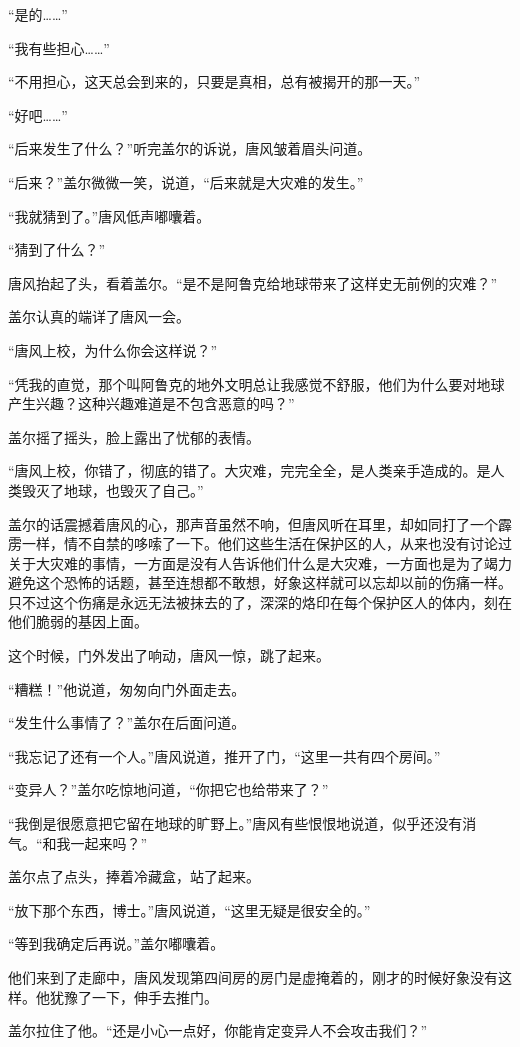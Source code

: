 “是的……”

“我有些担心……”

“不用担心，这天总会到来的，只要是真相，总有被揭开的那一天。”

“好吧……”

“后来发生了什么？”听完盖尔的诉说，唐风皱着眉头问道。

“后来？”盖尔微微一笑，说道，“后来就是大灾难的发生。”

“我就猜到了。”唐风低声嘟囔着。

“猜到了什么？”

唐风抬起了头，看着盖尔。“是不是阿鲁克给地球带来了这样史无前例的灾难？”

盖尔认真的端详了唐风一会。

“唐风上校，为什么你会这样说？”

“凭我的直觉，那个叫阿鲁克的地外文明总让我感觉不舒服，他们为什么要对地球产生兴趣？这种兴趣难道是不包含恶意的吗？”

盖尔摇了摇头，脸上露出了忧郁的表情。

“唐风上校，你错了，彻底的错了。大灾难，完完全全，是人类亲手造成的。是人类毁灭了地球，也毁灭了自己。”

盖尔的话震撼着唐风的心，那声音虽然不响，但唐风听在耳里，却如同打了一个霹雳一样，情不自禁的哆嗦了一下。他们这些生活在保护区的人，从来也没有讨论过关于大灾难的事情，一方面是没有人告诉他们什么是大灾难，一方面也是为了竭力避免这个恐怖的话题，甚至连想都不敢想，好象这样就可以忘却以前的伤痛一样。只不过这个伤痛是永远无法被抹去的了，深深的烙印在每个保护区人的体内，刻在他们脆弱的基因上面。

这个时候，门外发出了响动，唐风一惊，跳了起来。

“糟糕！”他说道，匆匆向门外面走去。

“发生什么事情了？”盖尔在后面问道。

“我忘记了还有一个人。”唐风说道，推开了门，“这里一共有四个房间。”

“变异人？”盖尔吃惊地问道，“你把它也给带来了？”

“我倒是很愿意把它留在地球的旷野上。”唐风有些恨恨地说道，似乎还没有消气。“和我一起来吗？”

盖尔点了点头，捧着冷藏盒，站了起来。

“放下那个东西，博士。”唐风说道，“这里无疑是很安全的。”

“等到我确定后再说。”盖尔嘟囔着。

他们来到了走廊中，唐风发现第四间房的房门是虚掩着的，刚才的时候好象没有这样。他犹豫了一下，伸手去推门。

盖尔拉住了他。“还是小心一点好，你能肯定变异人不会攻击我们？”

